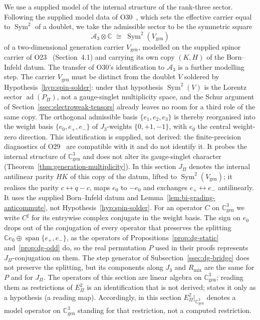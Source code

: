 \documentclass[11pt,a4paper]{article}
\theoremstyle{definition}
\theoremstyle{remark}
\DeclareMathOperator{\Sym}{Sym}
\begin{document}
  We use a supplied model of the internal structure of the rank-three sector.
  Following the supplied model data of O30~\cite{Beau2026a34}, which sets the effective carrier equal to
  $\Sym^2$ of a doublet, we take the admissible sector to be the symmetric square
  \begin{equation}
    \label{eq:a3-sym2}
    \mathcal{A}_3 \otimes \mathbb{C} \;\cong\; \Sym^2(V_{\mathrm{gen}})
  \end{equation}
  of a two-dimensional generation carrier $V_{\mathrm{gen}}$, modelled on the supplied spinor carrier of
  O23~\cite{Beau2026a27} (Section~4.1) and carrying its own copy $(K, H)$ of the Born--Infeld datum.
  The transfer of O30's identification to $\mathcal{A}_3$ is a further modelling step.
  The carrier $V_{\mathrm{gen}}$ must be distinct from the doublet $V$ soldered by
  Hypothesis~\ref{hyp:spin-solder}: under that hypothesis $\Sym^2(V)$ is the Lorentz sector
  $\operatorname{ad}(P_\Pi)$, not a gauge-singlet multiplicity space, and the Schur argument of
  Section~\ref{ssec:electroweak-tensors} already leaves no room for a third role of the same copy.
  The orthogonal admissible basis $\{e_1, e_2, e_3\}$ is thereby reorganised into the weight basis
  $\{e_0, e_+, e_-\}$ of $J_3$-weights $\{0, +1, -1\}$, with $e_0$ the central weight-zero
  direction.
  This identification is supplied, not derived: the finite-precision diagnostics of
  O29~\cite{Beau2026a33} are compatible with it and do not identify it.
  It probes the internal structure of $\mathbb{C}^3_{\mathrm{gen}}$ and does not alter its gauge-singlet
  character (Theorem~\ref{thm:generation-multiplicity}).
  In this section $J_\Pi$ denotes the internal antilinear parity $HK$ of this copy of the datum,
  lifted to $\Sym^2(V_{\mathrm{gen}})$; it realises the parity $c \leftrightarrow q-c$, maps $e_0$ to
  $-e_0$ and exchanges $e_+ \leftrightarrow e_-$ antilinearly.
  It uses the supplied Born--Infeld datum and Lemma~\ref{lem:bi-grading-anticommute}, not
  Hypothesis~\ref{hyp:spin-solder}.
  For an operator $C$ on $\mathbb{C}^3_{\mathrm{gen}}$ we write $C^{\sharp}$ for its entrywise complex
  conjugate in the weight basis.
  The sign on $e_0$ drops out of the conjugation of every operator that preserves the splitting
  $\mathbb{C} e_0 \oplus \operatorname{span}\{e_+, e_-\}$, as the operators of
  Propositions~\ref{prop:dg-static} and~\ref{prop:dg-odd} do, so the real permutation $P$ used in their
  proofs represents $J_\Pi$-conjugation on them.
  The step generator of Subsection~\ref{ssec:dg-bridge} does not preserve the splitting, but its
  components along $J_3$ and $R_{\mathrm{mix}}$ are the same for $P$ and for $J_\Pi$.
  The operators of this section are linear algebra on $\mathbb{C}^3_{\mathrm{gen}}$; reading them as
  restrictions of $E_\Pi^2$ is an identification that is not derived; \cite{Beau2026prs} states it only as a hypothesis
  (a reading map).
  Accordingly, in this section $E_\Pi^2|_{\mathbb{C}^3_{\mathrm{gen}}}$ denotes a model operator on
  $\mathbb{C}^3_{\mathrm{gen}}$ standing for that restriction, not a computed restriction.
\end{document}
